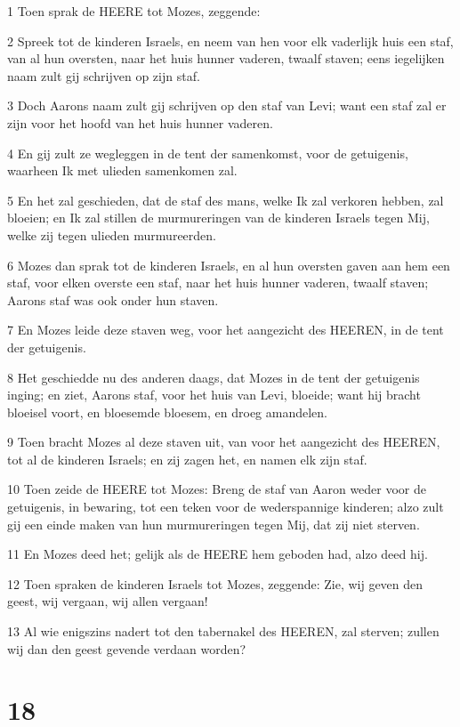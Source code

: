 \par 1 Toen sprak de HEERE tot Mozes, zeggende:
\par 2 Spreek tot de kinderen Israels, en neem van hen voor elk vaderlijk huis een staf, van al hun oversten, naar het huis hunner vaderen, twaalf staven; eens iegelijken naam zult gij schrijven op zijn staf.
\par 3 Doch Aarons naam zult gij schrijven op den staf van Levi; want een staf zal er zijn voor het hoofd van het huis hunner vaderen.
\par 4 En gij zult ze wegleggen in de tent der samenkomst, voor de getuigenis, waarheen Ik met ulieden samenkomen zal.
\par 5 En het zal geschieden, dat de staf des mans, welke Ik zal verkoren hebben, zal bloeien; en Ik zal stillen de murmureringen van de kinderen Israels tegen Mij, welke zij tegen ulieden murmureerden.
\par 6 Mozes dan sprak tot de kinderen Israels, en al hun oversten gaven aan hem een staf, voor elken overste een staf, naar het huis hunner vaderen, twaalf staven; Aarons staf was ook onder hun staven.
\par 7 En Mozes leide deze staven weg, voor het aangezicht des HEEREN, in de tent der getuigenis.
\par 8 Het geschiedde nu des anderen daags, dat Mozes in de tent der getuigenis inging; en ziet, Aarons staf, voor het huis van Levi, bloeide; want hij bracht bloeisel voort, en bloesemde bloesem, en droeg amandelen.
\par 9 Toen bracht Mozes al deze staven uit, van voor het aangezicht des HEEREN, tot al de kinderen Israels; en zij zagen het, en namen elk zijn staf.
\par 10 Toen zeide de HEERE tot Mozes: Breng de staf van Aaron weder voor de getuigenis, in bewaring, tot een teken voor de wederspannige kinderen; alzo zult gij een einde maken van hun murmureringen tegen Mij, dat zij niet sterven.
\par 11 En Mozes deed het; gelijk als de HEERE hem geboden had, alzo deed hij.
\par 12 Toen spraken de kinderen Israels tot Mozes, zeggende: Zie, wij geven den geest, wij vergaan, wij allen vergaan!
\par 13 Al wie enigszins nadert tot den tabernakel des HEEREN, zal sterven; zullen wij dan den geest gevende verdaan worden?

\chapter{18}


